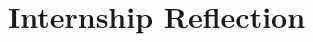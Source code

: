 \documentclass[../main.tex]{subfiles}
\begin{document}
\section{Internship Reflection}
\end{document}
